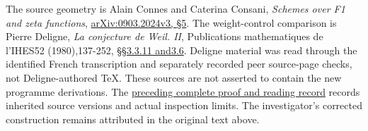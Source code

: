 The source geometry is Alain Connes and Caterina Consani, \emph{Schemes
over F1 and zeta functions},
\href{https://arxiv.org/abs/0903.2024v3}{arXiv:0903.2024v3, §5}. The
weight-control comparison is Pierre Deligne, \emph{La conjecture de
Weil. II}, Publications mathematiques de l'IHES52 (1980),137-252,
\href{https://www.numdam.org/item/PMIHES_1980__52__137_0/}{§§3.3.11
and3.6}. Deligne material was read through the identified French
transcription and separately recorded peer source-page checks, not
Deligne-authored TeX. These sources are not asserted to contain the new
programme derivations. The
\href{https://github.com/KokunoYumeto/zeta-function-research-reader/blob/36a82ecca98addb8a98b48204e349737856c7223/workbenches/splitzero-tandem/continuations/20260924-cohomology-weight-and-character-lifts/BUILD_AND_REVIEW.md}{preceding
complete proof and reading record} records inherited source versions and
actual inspection limits. The investigator's corrected construction
remains attributed in the original text above.
